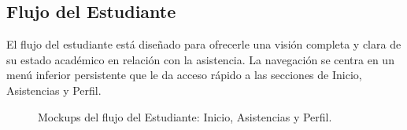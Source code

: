 \subsection{ Flujo del Estudiante}
\begin{samepage}\small
El flujo del estudiante está diseñado para ofrecerle una visión completa y clara de su estado académico en relación con la asistencia. La navegación se centra en un menú inferior persistente que le da acceso rápido a las secciones de Inicio, Asistencias y Perfil.
\begin{figure}[H]
	\centering
	\caption{Mockups del flujo del Estudiante: Inicio, Asistencias y Perfil.}\label{fig:mk-student-flow}
\end{figure}

\end{samepage}
